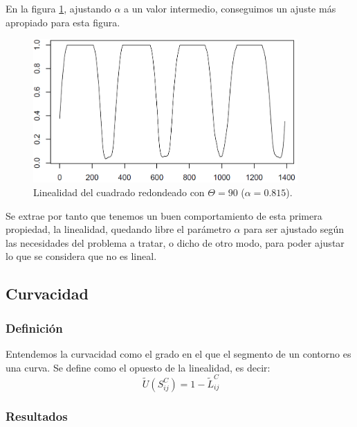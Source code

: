 En la figura \ref{fig8}, ajustando $\alpha$ a un valor intermedio, conseguimos un ajuste más apropiado para esta figura.\\

\begin{figure}[H]
\begin{center}

\includegraphics[width=0.9\textwidth]{img/lin-dev3-1-limpio-0815.png}
\end{center}

\caption{Linealidad del cuadrado redondeado con $\Theta = 90$ ($\alpha = 0.815$).}
\label{fig8}
\end{figure}

Se extrae por tanto que tenemos un buen comportamiento de esta primera propiedad, la linealidad, quedando libre el parámetro $\alpha$ para ser ajustado según las necesidades del problema a tratar, o dicho de otro modo, para poder ajustar lo que se considera que no es lineal.\\

\subsection{Curvacidad}


\subsubsection{Definición}

Entendemos la curvacidad como el grado en el que el segmento de un contorno es una curva. Se define como el opuesto de la linealidad, es decir:\\

\[
\ \tilde{U}(S^C_{ij}) = 1 - \tilde{L}^C_{ij}
\]
 
\subsubsection{Resultados}

